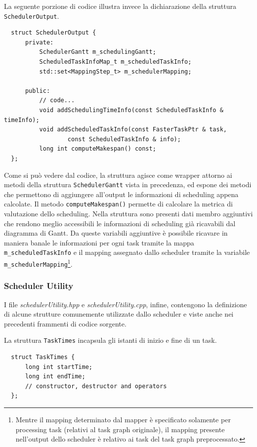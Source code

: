 La seguente porzione di codice illustra invece la dichiarazione della struttura 
\verb+SchedulerOutput+.
\newline
\begin{verbatim}
  struct SchedulerOutput {
      private:
          SchedulerGantt m_schedulingGantt;
          ScheduledTaskInfoMap_t m_scheduledTaskInfo;
          std::set<MappingStep_t> m_schedulerMapping;

      public:
          // code...
          void addSchedulingTimeInfo(const ScheduledTaskInfo & timeInfo);
          void addScheduledTaskInfo(const FasterTaskPtr & task,
                  const ScheduledTaskInfo & info);
          long int computeMakespan() const;
  };
\end{verbatim}
Come si può vedere dal codice, la struttura agisce come wrapper attorno ai 
metodi della struttura \verb+SchedulerGantt+ vista in precedenza, ed espone dei 
metodi che permettono di aggiungere all'output le informazioni di scheduling 
appena calcolate. Il metodo \verb+computeMakespan()+ permette di calcolare la 
metrica di valutazione dello scheduling. Nella struttura sono presenti dati 
membro aggiuntivi che rendono meglio accessibili le informazioni di scheduling 
già ricavabili dal diagramma di Gantt. Da queste variabili aggiuntive è 
possibile ricavare in maniera banale le informazioni per ogni task tramite la 
mappa \verb+m_scheduledTaskInfo+ e il mapping assegnato dallo scheduler tramite 
la variabile \verb+m_schedulerMapping+\footnote{Mentre il mapping determinato 
dal mapper è specificato solamente per processing task (relativi al task 
graph originale), il mapping presente nell'output dello scheduler è relativo ai 
task del task graph preprocessato.}.

\subsubsection{Scheduler Utility}
I file \emph{schedulerUtility.hpp} e \emph{schedulerUtility.cpp}, infine, 
contengono la definizione di alcune strutture comunemente utilizzate dallo 
scheduler e viste anche nei precedenti frammenti di codice sorgente.

La struttura \verb+TaskTimes+ incapsula gli istanti di inizio e fine di un task.
\newline
\begin{verbatim}
  struct TaskTimes {
      long int startTime;
      long int endTime;
      // constructor, destructor and operators
  };
\end{verbatim}

